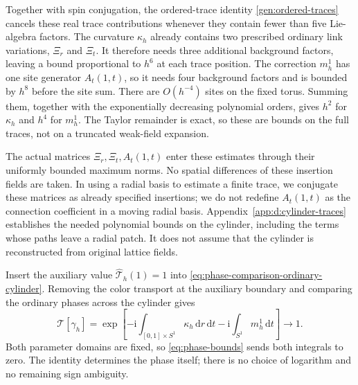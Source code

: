 \documentclass[11pt,a4paper]{article}
\theoremstyle{remark}
\newcommand{\dd}{\mathrm d}
\newcommand{\ii}{\mathrm i}
\begin{document}
Together with spin conjugation, the ordered-trace identity \eqref{gen:ordered-traces}
cancels these real trace contributions whenever they contain fewer than
five Lie-algebra factors. The curvature $\kappa_h$ already contains two prescribed ordinary link
variations, $\Xi_r$ and $\Xi_t$. It therefore needs three additional
background factors, leaving a bound proportional to $h^6$ at each trace
position. The correction $m_h^1$ has one site generator $A_t(1,t)$,
so it needs four background factors and is bounded by $h^8$ before the
site sum. There are $O(h^{-4})$ sites on the fixed torus. Summing them,
together with the exponentially decreasing polynomial orders, gives
$h^2$ for $\kappa_h$ and $h^4$ for $m_h^1$.
The Taylor remainder is exact, so these are bounds on the full traces,
not on a truncated weak-field expansion.

The actual matrices $\Xi_r,\Xi_t,A_t(1,t)$ enter these estimates
through their uniformly bounded maximum norms. No spatial differences
of these insertion fields are taken. In using a radial basis to estimate
a finite trace, we conjugate these matrices as already specified
insertions; we do not redefine $A_t(1,t)$ as the connection coefficient in
a moving radial basis. Appendix~\ref{app:d:cylinder-traces} establishes
the needed polynomial bounds on the cylinder, including the terms whose
paths leave a radial patch. It does not assume that the cylinder is
reconstructed from original lattice fields.

Insert the auxiliary value $\widehat{\mathcal T}_h(1)=1$ into
\eqref{eq:phase-comparison-ordinary-cylinder}. Removing the color
transport at the auxiliary boundary and comparing the ordinary phases
across the cylinder gives
\begin{equation}
 \mathcal T[\gamma_h]=
 \exp\!\left[-\ii\int_{[0,1]\times S^1}\kappa_h\,\dd r\,\dd t
             -\ii\int_{S^1}m_h^1\,\dd t\right]
 \longrightarrow1 .
 \label{eq:limiting-twist}
\end{equation}
Both parameter domains are fixed, so \eqref{eq:phase-bounds} sends both
integrals to zero. The identity determines the phase itself; there is
no choice of logarithm and no remaining sign ambiguity.
\end{document}
